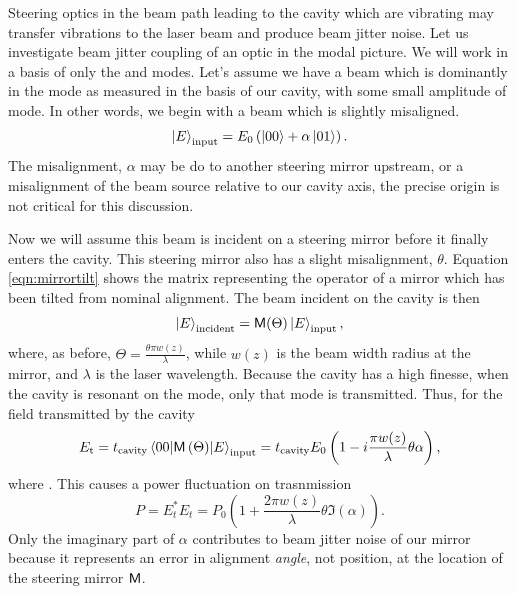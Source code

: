 Steering optics in the beam path leading to the cavity which are vibrating may transfer vibrations to the laser beam and produce beam jitter noise. %
Let us investigate beam jitter coupling of an optic in the modal picture. %
 We will work in a basis of only the  and  modes. %
Let's assume we have a beam which is dominantly in the  mode as measured in the basis of our cavity, with some small amplitude of  mode. %
In other words, we begin with a beam which is slightly misaligned.
\begin{equation}
\left| E \right>_{\text{input}}=E_0\left(\left| 00 \right>+\alpha\left| 01 \right>\right).
\end{equation}
The misalignment, $\alpha$ may be do to another steering mirror upstream, or a misalignment of the beam source relative to our cavity axis, the precise origin is not critical for this discussion.

Now we will assume this beam is incident on a steering mirror before it finally enters the cavity. %
This steering mirror also has a slight misalignment, $\theta$. %
Equation \ref{eqn:mirrortilt} shows the matrix representing the operator of a mirror which has been tilted from nominal alignment. %
The beam incident on the cavity is then
\begin{equation}
\left| E \right>_{\text{incident}}=\mathsf{M}(\Theta)\left| E \right>_{\text{input}},
\end{equation}
where, as before, $\Theta=\frac{\theta \pi w(z)}{\lambda}$, while $w(z)$ is the beam width radius at the mirror, and $\lambda$ is the laser wavelength. %
Because the cavity has a high finesse, when the cavity is resonant on the  mode, only that mode is transmitted. %
Thus, for the field transmitted by the cavity
\begin{equation}
E_{\text{t}}=t_{\text{cavity}}\matrixel{00}{\oper{M}\left(\Theta\right)}{E}_{\text{input}}=t_{\text{cavity}}E_0\left(1-i\frac{ \pi w(z)}{\lambda}\theta\alpha\right),
\end{equation}
where . %
This causes a power fluctuation on trasnmission
\begin{equation}
\label{eqn:mirrorjitter}
P=E_t^*E_t=P_0\left(1+\frac{2\pi w(z)}{\lambda}\theta\Im(\alpha)\right).
\end{equation}
Only the imaginary part of $\alpha$ contributes to beam jitter noise of our mirror because it represents an error in alignment \emph{angle}, not position, at the location of the steering mirror $\mathsf{M}$. %

